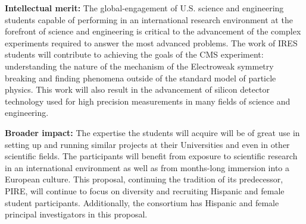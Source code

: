 \documentclass[12pt]{article}
\begin{document}
{\bf Intellectual merit:} The global-engagement of U.S. science and
engineering students capable of performing in an international
research environment at the forefront of science and engineering is
critical to the advancement of the complex experiments required to
answer the most advanced problems. The work of IRES students will
contribute to achieving the goals of the CMS experiment: understanding
the nature of the mechanism of the Electroweak symmetry breaking and
finding phenomena outside of the standard model of particle
physics.  This work will also result in the advancement of silicon
detector technology used for high precision measurements in many
fields of science and engineering.

{\bf Broader impact:} The expertise the students will acquire will be
of great use in setting up and running similar projects at their
Universities and even in other scientific fields. The participants
will benefit from exposure to scientific research in an international
environment as well as from months-long immersion into a European
culture. This proposal, continuing the tradition of its predecessor,
PIRE, will continue to focus on diversity and recruiting Hispanic and
female student participants. Additionally, the consortium has Hispanic
and female principal investigators in this proposal.
\end{document}
